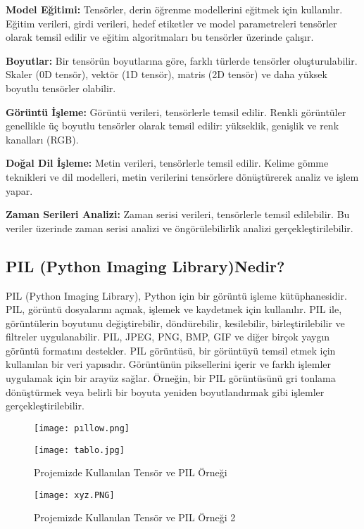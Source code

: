 \documentclass[12pt]{article}
\begin{document}
\textbf{Model Eğitimi:} Tensörler, derin öğrenme modellerini eğitmek için kullanılır. Eğitim verileri, girdi verileri, hedef etiketler ve model parametreleri tensörler olarak temsil edilir ve eğitim algoritmaları bu tensörler üzerinde çalışır.

\textbf{Boyutlar:} Bir tensörün boyutlarına göre, farklı türlerde tensörler oluşturulabilir. Skaler (0D tensör), vektör (1D tensör), matris (2D tensör) ve daha yüksek boyutlu tensörler olabilir.

\textbf{Görüntü İşleme:} Görüntü verileri, tensörlerle temsil edilir. Renkli görüntüler genellikle üç boyutlu tensörler olarak temsil edilir: yükseklik, genişlik ve renk kanalları (RGB).

\textbf{Doğal Dil İşleme:} Metin verileri, tensörlerle temsil edilir. Kelime gömme teknikleri ve dil modelleri, metin verilerini tensörlere dönüştürerek analiz ve işlem yapar.

\textbf{Zaman Serileri Analizi:} Zaman serisi verileri, tensörlerle temsil edilebilir. Bu veriler üzerinde zaman serisi analizi ve öngörülebilirlik analizi gerçekleştirilebilir.
\subsection{PIL (Python Imaging Library)Nedir?}
PIL (Python Imaging Library), Python için bir görüntü işleme kütüphanesidir. PIL, görüntü dosyalarını açmak, işlemek ve kaydetmek için kullanılır. PIL ile, görüntülerin boyutunu değiştirebilir, döndürebilir, kesilebilir, birleştirilebilir ve filtreler uygulanabilir. PIL, JPEG, PNG, BMP, GIF ve diğer birçok yaygın görüntü formatını destekler. PIL görüntüsü, bir görüntüyü temsil etmek için kullanılan bir veri yapısıdır. Görüntünün piksellerini içerir ve farklı işlemler uygulamak için bir arayüz sağlar. Örneğin, bir PIL görüntüsünü gri tonlama dönüştürmek veya belirli bir boyuta yeniden boyutlandırmak gibi işlemler gerçekleştirilebilir.
\begin{figure}[h]
    \centering
    \texttt{[image: pıllow.png]}
    \label{fig:enter-label}
\end{figure}\newline
\begin{figure}[h]
    \centering
    \texttt{[image: tablo.jpg]}
    \caption{Projemizde Kullanılan Tensör ve PIL Örneği}
    \label{fig:enter-label}
\end{figure}
\newpage
\begin{figure}[h]
    \centering
    \texttt{[image: xyz.PNG]}
    \caption{Projemizde Kullanılan Tensör ve PIL Örneği 2}
    \label{fig:enter-label}
\end{figure} 
\end{document}
